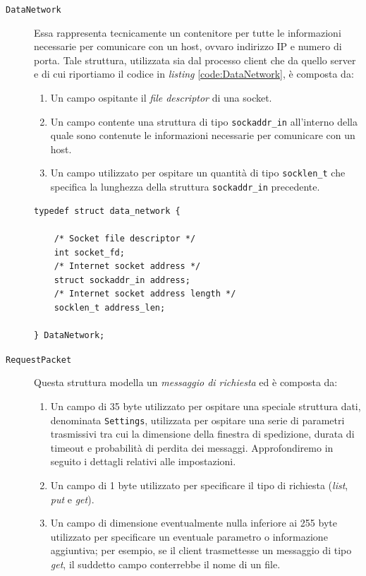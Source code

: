 \documentclass[10pt,a4paper, titlepage]{report}
\begin{document}
\begin{description}
\item[\texttt{DataNetwork}] Essa rappresenta tecnicamente un contenitore per tutte le informazioni necessarie per comunicare con un host, ovvaro indirizzo IP e numero di porta. Tale struttura, utilizzata sia dal processo client che da quello server e di cui riportiamo il codice in \textit{listing} \ref{code:DataNetwork}, è composta da:
\begin{enumerate}
\item Un campo ospitante il \textit{file descriptor} di una socket.
\item Un campo contente una struttura di tipo \texttt{sockaddr\_in} all'interno della quale sono contenute le informazioni necessarie per comunicare con un host.
\item Un campo utilizzato per ospitare un quantità di tipo \texttt{socklen\_t} che specifica la lunghezza della struttura \texttt{sockaddr\_in} precedente.
\end{enumerate}

\begin{lstlisting}[frame=lines, caption={Implementazione della struttura \texttt{DataNetwork}}, label={code:DataNetwork}]
typedef struct data_network {

	/* Socket file descriptor */
	int socket_fd;
	/* Internet socket address */
	struct sockaddr_in address;
	/* Internet socket address length */
	socklen_t address_len;

} DataNetwork;
\end{lstlisting}


\item[\texttt{RequestPacket}] Questa struttura modella un \textit{messaggio di richiesta} ed è composta da:
\begin{enumerate}
\item Un campo di 35 byte utilizzato per ospitare una speciale struttura dati, denominata \texttt{Settings}, utilizzata per ospitare una serie di parametri trasmissivi tra cui la dimensione della finestra di spedizione, durata di timeout e probabilità di perdita dei messaggi. Approfondiremo in seguito i dettagli relativi alle impostazioni.
\item Un campo di 1 byte utilizzato per specificare il tipo di richiesta (\textit{list}, \textit{put} e \textit{get}).
\item Un campo di dimensione eventualmente nulla inferiore ai 255 byte utilizzato per specificare un eventuale parametro o informazione aggiuntiva; per esempio, se il client trasmettesse un messaggio di tipo \textit{get}, il suddetto campo conterrebbe il nome di un file.
\end{enumerate}
\end{description}
\end{document}
